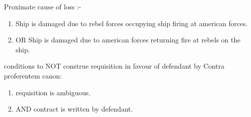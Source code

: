      Proximate cause of loss :-
     
     \begin{enumerate}
        \item Ship is damaged due to rebel forces occupying ship firing at american forces.
        \item OR Ship is damaged due to american forces returning fire at rebels on the ship.
     \end{enumerate}
     
     conditions to NOT construe requisition in favour of defendant by Contra proferentem canon:
         \begin{enumerate}
             \item requisition is ambiguous.
             \item AND contract is written by defendant.
         \end{enumerate}


\FloatBarrier
